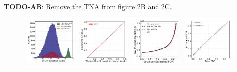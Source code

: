 \documentclass{article}
\newcommand{\todo}[2]{{\color{red} {\bf TODO-#1}: #2}}
\begin{document}

\todo{AB}{Remove the TNA from figure 2B and 2C}.

\begin{figure}
	\centering
	\begin{tabular}{cccc}
		\includegraphics[width=1.78in]{img/cls_overview.png}&
		\includegraphics[width=1.73in]{img/cnn_QQ_classical.png} &
		\includegraphics[width=1.69in]{img/cnn_classical_fdr_control.png} &
		\includegraphics[width=1.68in]{img/cnn_FDRQQ_classical.png} \\

\end{tabular}
\end{figure}
\end{document}
